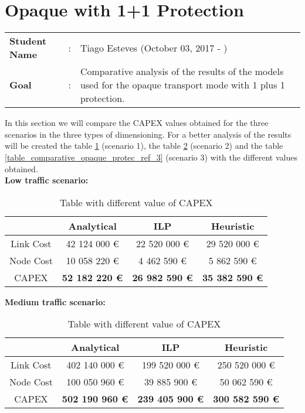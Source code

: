 \clearpage

\section{Opaque with 1+1 Protection}\label{comparative_Opaque_Protection}
\begin{tcolorbox}	
\begin{tabular}{p{2.75cm} p{0.2cm} p{10.5cm}} 	
\textbf{Student Name}  &:& Tiago Esteves    (October 03, 2017 - )\\
\textbf{Goal}          &:& Comparative analysis of the results of the models used for the opaque transport mode with 1 plus 1 protection.
\end{tabular}
\end{tcolorbox}
\vspace{11pt}


In this section we will compare the CAPEX values obtained for the three scenarios in the three types of dimensioning. For a better analysis of the results will be created the table \ref{table_comparative_opaque_protec_ref_1} (scenario 1), the table \ref{table_comparative_opaque_protec_ref_2} (scenario 2) and the table \ref{table_comparative_opaque_protec_ref_3} (scenario 3) with the different values obtained.\\

\textbf{Low traffic scenario:}

\begin{table}[h!]
\centering
\begin{tabular}{| c | c | c | c |}
 \hline
   & Analytical & ILP & Heuristic \\
 \hline\hline
 Link Cost & 42 124 000 \euro & 22 520 000 \euro & 29 520 000 \euro \\
 Node Cost & 10 058 220 \euro & 4 462 590 \euro & 5 862 590 \euro \\
 CAPEX & \textbf{52 182 220 \euro} & \textbf{26 982 590 \euro} & \textbf{35 382 590 \euro} \\
 \hline
\end{tabular}
\caption{Table with different value of CAPEX }
\label{table_comparative_opaque_protec_ref_1}
\end{table}


\vspace{11pt}
\textbf{Medium traffic scenario:}

\begin{table}[h!]
\centering
\begin{tabular}{| c | c | c | c |}
 \hline
   & Analytical & ILP & Heuristic \\
 \hline\hline
 Link Cost & 402 140 000 \euro & 199 520 000 \euro & 250 520 000 \euro \\
 Node Cost & 100 050 960 \euro & 39 885 900 \euro & 50 062 590 \euro \\
 CAPEX & \textbf{502 190 960 \euro} & \textbf{239 405 900 \euro} & \textbf{300 582 590 \euro} \\
 \hline
\end{tabular}
\caption{Table with different value of CAPEX }
\label{table_comparative_opaque_protec_ref_2}
\end{table}



